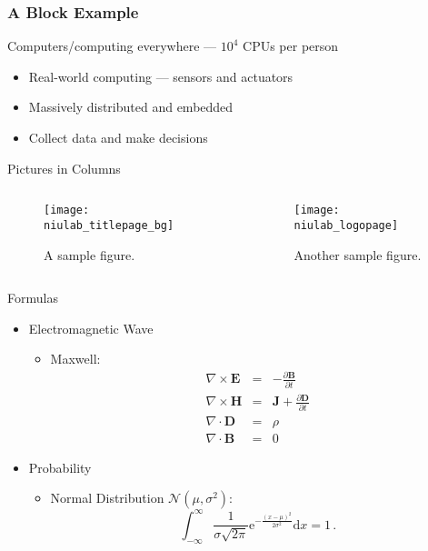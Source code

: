 \documentclass[usepdftitle=false]{beamer}
\begin{document}
\begin{frame}
  \frametitle{A Block Example}
  \begin{block}{Computers/computing everywhere --- $10^4$ CPUs per person}
    \begin{itemize}
      \item Real-world computing --- sensors and actuators
      \item Massively distributed and embedded
      \item Collect data and make decisions
    \end{itemize}
  \end{block}
\end{frame}

\begin{frame}{Pictures in Columns}
  \begin{columns}
    \begin{column}{.5\textwidth}
      \begin{figure}[htbp]
        \centering
        \texttt{[image: niulab\_titlepage\_bg]}
        \caption{A sample figure.}
      \end{figure}
    \end{column}
    \begin{column}{.5\textwidth}
      \begin{figure}[htbp]
        \centering
        \texttt{[image: niulab\_logopage]}
        \caption{Another sample figure.}
      \end{figure}
    \end{column}
  \end{columns}
\end{frame}

\begin{frame}{Formulas}
  \begin{itemize}
    \item Electromagnetic Wave
      \begin{itemize}
        \item Maxwell:
          \begin{eqnarray*}
            \nabla \times \mathbf{E} & = & - \frac{\partial
            \mathbf{B}}{\partial t}\\
            \nabla \times \mathbf{H} & = & \mathbf{J} +
            \frac{\partial \mathbf{D}}{\partial t}\\
            \nabla \cdot \mathbf{D} & = & \rho \\
            \nabla \cdot\mathbf{B} & = & 0
            \label{maxwell}
          \end{eqnarray*}
      \end{itemize}
    \item Probability
      \begin{itemize}
        \item Normal Distribution $\mathcal{N}(\mu,\sigma^2)$:
          \[
          \int_{-\infty}^{\infty}\frac{1}{\sigma\sqrt{2\pi}}\mathrm{e}^{-\frac{(x-\mu)^2}{2\sigma^2}}\mathrm{d}x= 1 \, .
          \]
      \end{itemize}
  \end{itemize}
\end{frame}
\end{document}
